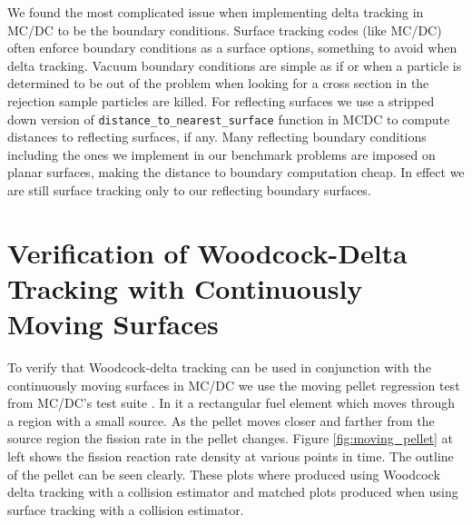 We found the most complicated issue when implementing delta tracking in MC/DC to be the boundary conditions.
Surface tracking codes (like MC/DC) often enforce boundary conditions as a surface options, something to avoid when delta tracking.
Vacuum boundary conditions are simple as if or when a particle is determined to be out of the problem when looking for a cross section in the rejection sample particles are killed.
For reflecting surfaces we use a stripped down version of \texttt{distance\_to\_nearest\_surface} function in MCDC to compute distances to reflecting surfaces, if any.
Many reflecting boundary conditions including the ones we implement in our benchmark problems are imposed on planar surfaces, making the distance to boundary computation cheap.
In effect we are still surface tracking only to our reflecting boundary surfaces.


\section{Verification of Woodcock-Delta Tracking with Continuously Moving Surfaces}

To verify that Woodcock-delta tracking can be used in conjunction with the continuously moving surfaces in MC/DC we use the moving pellet regression test from MC/DC's test suite \cite{morgan_monte_2024}.
In it a rectangular fuel element which moves through a region with a small source.
As the pellet moves closer and farther from the source region the fission rate in the pellet changes.
Figure \ref{fig:moving_pellet} at left shows the fission reaction rate density at various points in time.
The outline of the pellet can be seen clearly.
These plots where produced using Woodcock delta tracking with a collision estimator and matched plots produced when using surface tracking with a collision estimator.

